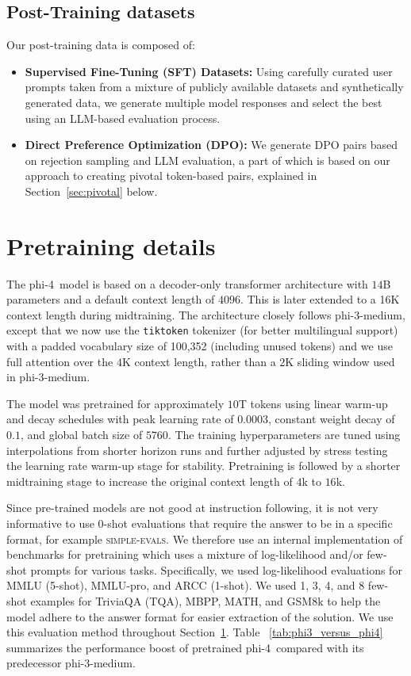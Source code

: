 \documentclass[11pt]{article}
\newcommand{\modelwithoutspace}{\textsf{phi-4}}
\newcommand{\model}{\modelwithoutspace~}
\newcommand{\phithree}{\textsf{phi-3}}
\newcommand{\phithreemed}{\textsf{phi-3-medium}}
\begin{document}
\subsection{Post-Training datasets} 
Our post-training data is composed of:
\begin{itemize}
    \item \textbf{Supervised Fine-Tuning (SFT) Datasets:} Using carefully curated user prompts taken from a mixture of publicly available datasets and synthetically generated data, we generate multiple model responses and select the best using an LLM-based evaluation process. 
    \item \textbf{Direct Preference Optimization (DPO):} We generate DPO pairs based on rejection sampling and LLM evaluation, a part of which is based on our approach to creating pivotal token-based pairs, explained in Section~\ref{sec:pivotal} below.
\end{itemize}


\section{Pretraining details}\label{sec:pretrain}
The \model model is based on a decoder-only transformer architecture \cite{Vas17} with $14$B parameters and a default context length of $4096$.  This is later extended to a 16K context length during midtraining. The architecture closely follows \phithree{}-medium, except that we now use the \texttt{tiktoken} tokenizer (for better multilingual support) with a padded vocabulary size of {100,352} (including unused tokens) and we use full attention over the $4$K context length, rather than a $2$K sliding window  used in \phithreemed.

The model was pretrained for approximately $10$T tokens using linear warm-up and decay schedules with peak learning rate of $0.0003$, constant weight decay of $0.1$, and global batch size of $5760$. The training hyperparameters are tuned using interpolations from shorter horizon runs and further adjusted by stress testing the learning rate warm-up stage for stability. Pretraining is followed by a shorter midtraining stage to increase the original context length of $4$k to $16$k.

Since pre-trained models are not good at instruction following, it is not very informative to use 0-shot evaluations that require the answer to be in a specific format, for example \textsc{simple-evals}. We therefore use an internal implementation of benchmarks for pretraining which uses a mixture of log-likelihood and/or few-shot prompts for various tasks. Specifically, we used log-likelihood evaluations for MMLU (5-shot), MMLU-pro, and ARCC (1-shot). We used 1, 3, 4, and 8 few-shot examples for TriviaQA (TQA), MBPP, MATH, and GSM8k to help the model adhere to the answer format for easier extraction of the solution. We use this evaluation method throughout Section~\ref{sec:pretrain}. Table ~\ref{tab:phi3_versus_phi4} summarizes the performance boost of pretrained \model compared with its predecessor \phithree{}-medium.
\end{document}
